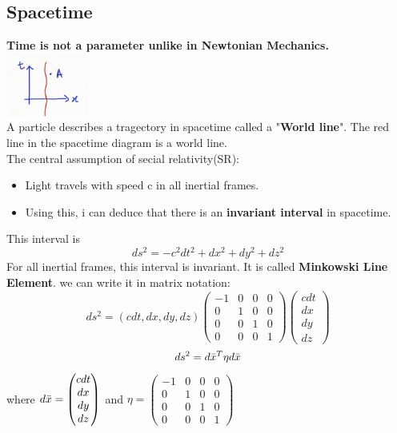 \documentclass{article}
\begin{document}
\subsection{Spacetime}
\textbf{Time is not a parameter unlike in Newtonian Mechanics.}
\\
\includegraphics{worldline.png}
\\
A particle describes a tragectory in spacetime called a "\textbf{World line}". The red line in the spacetime diagram is a world line.
\\
The central assumption of secial relativity(SR):\\
\begin{itemize}
    \item Light travels with speed c in all inertial frames.
    \item Using this, i can deduce that there is an \textbf{invariant interval} in spacetime.
\end{itemize}
This interval is $$ds^2=-c^2dt^2+dx^2+dy^2+dz^2$$
For all inertial frames, this interval is invariant.
It is called\textbf{ Minkowski Line Element}. we can write it in matrix notation:\\
$$ds^2=(cdt,dx,dy,dz)\begin{pmatrix}
    -1&0&0&0\\
    0&1&0&0\\
    0&0&1&0\\
    0&0&0&1
\end{pmatrix} \begin{pmatrix}
    cdt\\dx\\
    dy\\
    dz
\end{pmatrix}$$
$$ds^2=d\Bar{x}^T \eta d\Bar{x}$$
where $d\Bar{x}= \begin{pmatrix}
    cdt\\dx\\dy\\dz
\end{pmatrix}$ and $\eta =\begin{pmatrix}
    -1&0&0&0\\
    0&1&0&0\\
    0&0&1&0\\
    0&0&0&1
\end{pmatrix} $
\end{document}
